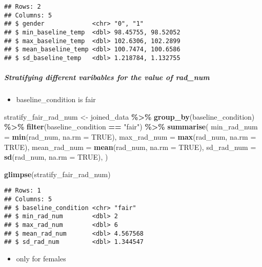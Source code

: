 \documentclass[
]{article}
\newenvironment{Shaded}{\begin{snugshade}}{\end{snugshade}}
\newcommand{\AttributeTok}[1]{\textcolor[rgb]{0.13,0.29,0.53}{#1}}
\newcommand{\ConstantTok}[1]{\textcolor[rgb]{0.56,0.35,0.01}{#1}}
\newcommand{\FunctionTok}[1]{\textcolor[rgb]{0.13,0.29,0.53}{\textbf{#1}}}
\newcommand{\NormalTok}[1]{#1}
\newcommand{\OtherTok}[1]{\textcolor[rgb]{0.56,0.35,0.01}{#1}}
\newcommand{\SpecialCharTok}[1]{\textcolor[rgb]{0.81,0.36,0.00}{\textbf{#1}}}
\newcommand{\StringTok}[1]{\textcolor[rgb]{0.31,0.60,0.02}{#1}}
\providecommand{\tightlist}{%
  \setlength{\itemsep}{0pt}\setlength{\parskip}{0pt}}
\begin{document}
\begin{verbatim}
## Rows: 2
## Columns: 5
## $ gender             <chr> "0", "1"
## $ min_baseline_temp  <dbl> 98.45755, 98.52052
## $ max_baseline_temp  <dbl> 102.6306, 102.2899
## $ mean_baseline_temp <dbl> 100.7474, 100.6586
## $ sd_baseline_temp   <dbl> 1.218784, 1.132755
\end{verbatim}

\subparagraph{Stratifying different varibables for the value of
rad\_num}\label{stratifying-different-varibables-for-the-value-of-rad_num}

\begin{itemize}
\tightlist
\item
  baseline\_condition is fair
\end{itemize}

\begin{Shaded}
\begin{Highlighting}[]
\NormalTok{stratify\_fair\_rad\_num }\OtherTok{\textless{}{-}}\NormalTok{ joined\_data }\SpecialCharTok{\%\textgreater{}\%}
  \FunctionTok{group\_by}\NormalTok{(baseline\_condition) }\SpecialCharTok{\%\textgreater{}\%} \FunctionTok{filter}\NormalTok{(baseline\_condition }\SpecialCharTok{==} \StringTok{"fair"}\NormalTok{) }\SpecialCharTok{\%\textgreater{}\%} 
  \FunctionTok{summarise}\NormalTok{(}
    \AttributeTok{min\_rad\_num =} \FunctionTok{min}\NormalTok{(rad\_num, }\AttributeTok{na.rm =} \ConstantTok{TRUE}\NormalTok{),}
    \AttributeTok{max\_rad\_num =} \FunctionTok{max}\NormalTok{(rad\_num, }\AttributeTok{na.rm =} \ConstantTok{TRUE}\NormalTok{),}
    \AttributeTok{mean\_rad\_num =} \FunctionTok{mean}\NormalTok{(rad\_num, }\AttributeTok{na.rm =} \ConstantTok{TRUE}\NormalTok{),}
    \AttributeTok{sd\_rad\_num =} \FunctionTok{sd}\NormalTok{(rad\_num, }\AttributeTok{na.rm =} \ConstantTok{TRUE}\NormalTok{),}
\NormalTok{  ) }

\FunctionTok{glimpse}\NormalTok{(stratify\_fair\_rad\_num)}
\end{Highlighting}
\end{Shaded}

\begin{verbatim}
## Rows: 1
## Columns: 5
## $ baseline_condition <chr> "fair"
## $ min_rad_num        <dbl> 2
## $ max_rad_num        <dbl> 6
## $ mean_rad_num       <dbl> 4.567568
## $ sd_rad_num         <dbl> 1.344547
\end{verbatim}

\begin{itemize}
\tightlist
\item
  only for females
\end{itemize}
\end{document}
